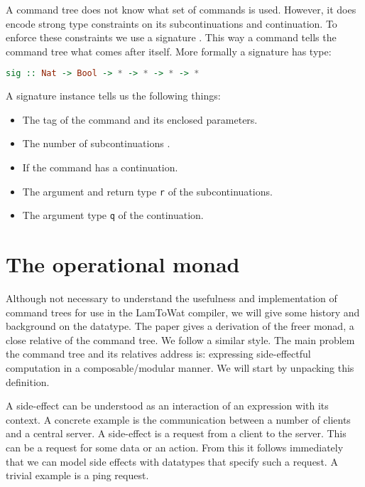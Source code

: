 A command tree does not know what set of commands is used. However, it does encode strong type constraints on its subcontinuations and continuation. To enforce these constraints we use a signature . This way a command tells the command tree what comes after itself. More formally a signature has type:

\begin{lstlisting}[language=Haskell]
sig :: Nat -> Bool -> * -> * -> * -> *
\end{lstlisting}

A signature instance  tells us the following things:

\begin{itemize}
\item The tag of the command and its enclosed parameters.
\item The number of subcontinuations .
\item If the command has a continuation.
\item The argument  and return type \lstinline{r} of the subcontinuations.
\item The argument type \lstinline{q} of the continuation.
\end{itemize}

\section{\label{section:opmonad}The operational monad}
Although not necessary to understand the usefulness and implementation of command trees for use in the LamToWat compiler, we will give some history and background on the datatype. The paper  gives a derivation of the freer monad, a close relative of the command tree. We follow a similar style. The main problem the command tree and its relatives address is: expressing side-effectful computation in a composable/modular manner. We will start by unpacking this definition.

A side-effect can be understood as an interaction of an expression with its context\autocite{DBLP:conf/tacs/CartwrightF94}. A concrete example is the communication between a number of clients and a central server. A side-effect is a request from a client to the server. This can be a request for some data or an action. From this it follows immediately that we can model side effects with datatypes that specify such a request. A trivial example is a ping request.

